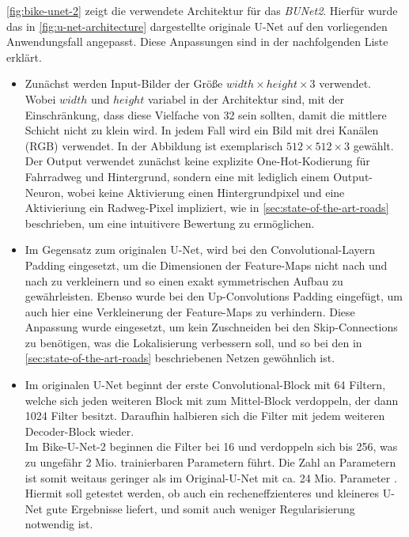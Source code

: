 \autoref{fig:bike-unet-2} zeigt die verwendete Architektur für das \textit{\ac{BUNet2}}. 
Hierfür wurde das in \autoref{fig:u-net-architecture} 
dargestellte originale U-Net auf den vorliegenden Anwendungsfall angepasst.
Diese Anpassungen sind in der nachfolgenden Liste erklärt.

\begin{itemize}
	\item Zunächst werden Input-Bilder der Größe $width \times height \times 3$ verwendet. 
	Wobei $width$ und $height$ variabel in der Architektur sind, mit der Einschränkung, 
	dass diese Vielfache von 32 sein sollten, damit die mittlere Schicht nicht zu klein wird. 
	In jedem Fall wird ein Bild mit drei Kanälen (RGB) verwendet. 
	In der Abbildung ist exemplarisch $512 \times 512 \times 3$ gewählt. \\
	Der Output verwendet zunächst keine explizite One-Hot-Kodierung für Fahrradweg und Hintergrund, 
	sondern eine mit lediglich einem Output-Neuron, wobei keine Aktivierung einen Hintergrundpixel 
	und eine Aktivieriung ein Radweg-Pixel impliziert, wie in \autoref{sec:state-of-the-art-roads} beschrieben, 
	um eine intuitivere Bewertung zu ermöglichen. 
	\item Im Gegensatz zum originalen U-Net, wird bei den Convolutional-Layern Padding eingesetzt,
	um die Dimensionen der Feature-Maps nicht nach und nach zu verkleinern und so einen exakt symmetrischen Aufbau zu gewährleisten.
	Ebenso wurde bei den Up-Convolutions Padding eingefügt, um auch hier eine Verkleinerung der Feature-Maps zu verhindern.
	Diese Anpassung wurde eingesetzt, um kein Zuschneiden bei den Skip-Connections zu benötigen, was die Lokalisierung verbessern soll,
	und so bei den in \autoref{sec:state-of-the-art-roads} beschriebenen Netzen gewöhnlich ist.
	\item Im originalen U-Net beginnt der erste Convolutional-Block mit 64 Filtern, 
	welche sich jeden weiteren Block mit zum Mittel-Block verdoppeln, der dann 1024 Filter besitzt.
	Daraufhin halbieren sich die Filter mit jedem weiteren Decoder-Block wieder. \\
	Im Bike-U-Net-2 beginnen die Filter bei 16 und verdoppeln sich bis 256, was zu ungefähr 2 Mio. 
	trainierbaren Parametern führt. Die Zahl an Parametern ist somit weitaus geringer als im 
	Original-U-Net mit ca. 24 Mio. Parameter \cite{Ronneberger.18052015}. 
	Hiermit soll getestet werden, ob auch ein recheneffzienteres und kleineres U-Net gute Ergebnisse liefert, 
	und somit auch weniger Regularisierung notwendig ist. \\

\end{itemize}
